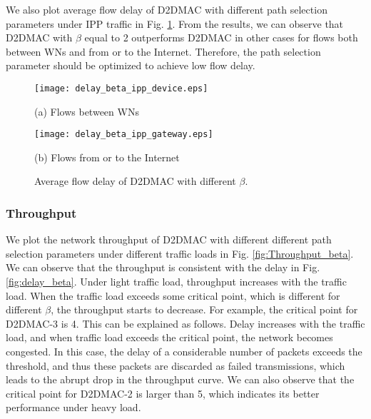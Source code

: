 \documentclass[journal]{IEEEtran}
\begin{document}
We also plot average flow delay of D2DMAC with different path selection parameters under IPP
traffic in Fig. \ref{fig:delay_beta_ipp_flow}. From the results, we can observe that D2DMAC with
$\beta$ equal to 2 outperforms D2DMAC in other cases for flows both between WNs and from or to the
Internet. Therefore, the path selection parameter should be optimized to achieve low flow delay.




\begin{figure}[htbp]
\begin{minipage}[t]{0.5\linewidth}
\centering
\texttt{[image: delay\_beta\_ipp\_device.eps]}
\centerline{\small (a) Flows between WNs}
\end{minipage}\begin{minipage}[t]{0.5\linewidth}
\centering
\texttt{[image: delay\_beta\_ipp\_gateway.eps]}
\centerline{\small (b) Flows from or to the Internet}
\end{minipage}\caption{Average flow delay of D2DMAC with different $\beta$.}
\label{fig:delay_beta_ipp_flow} \vspace*{-3mm}
\end{figure}











\subsubsection{Throughput}

We plot the network throughput of D2DMAC with different different path selection parameters under
different traffic loads in Fig. \ref{fig:Throughput_beta}. We can observe that the throughput is
consistent with the delay in Fig. \ref{fig:delay_beta}. Under light traffic load, throughput
increases with the traffic load. When the traffic load exceeds some critical point, which is
different for different $\beta$, the throughput starts to decrease. For example, the critical point
for D2DMAC-3 is 4. This can be explained as follows. Delay increases with the traffic load, and
when traffic load exceeds the critical point, the network becomes congested. In this case, the
delay of a considerable number of packets exceeds the threshold, and thus these packets are
discarded as failed transmissions, which leads to the abrupt drop in the throughput curve. We can
also observe that the critical point for D2DMAC-2 is larger than 5, which indicates its better
performance under heavy load.
\end{document}
